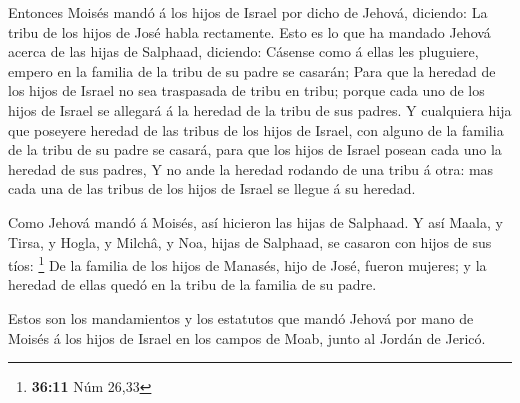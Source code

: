  Entonces Moisés mandó á los hijos de Israel por dicho de
Jehová, diciendo: La tribu de los hijos de José habla rectamente.
 Esto es lo que ha mandado Jehová acerca de las hijas de
Salphaad, diciendo: Cásense como á ellas les pluguiere, empero en la
familia de la tribu de su padre se casarán;  Para que la
heredad de los hijos de Israel no sea traspasada de tribu en tribu;
porque cada uno de los hijos de Israel se allegará á la heredad de la
tribu de sus padres.  Y cualquiera hija que poseyere heredad
de las tribus de los hijos de Israel, con alguno de la familia de la
tribu de su padre se casará, para que los hijos de Israel posean cada
uno la heredad de sus padres,  Y no ande la heredad rodando
de una tribu á otra: mas cada una de las tribus de los hijos de Israel
se llegue á su heredad.

 Como Jehová mandó á Moisés, así hicieron las hijas de
Salphaad.  Y así Maala, y Tirsa, y Hogla, y Milchâ, y Noa,
hijas de Salphaad, se casaron con hijos de sus tíos: \footnote{\textbf{36:11}
  Núm 26,33}  De la familia de los hijos de Manasés, hijo
de José, fueron mujeres; y la heredad de ellas quedó en la tribu de la
familia de su padre.

 Estos son los mandamientos y los estatutos que mandó
Jehová por mano de Moisés á los hijos de Israel en los campos de Moab,
junto al Jordán de Jericó.
